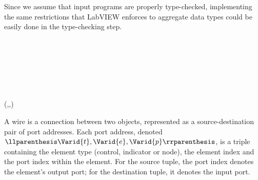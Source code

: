 Since we assume that input programs are properly type-checked, implementing
the same restrictions that LabVIEW enforces to aggregate data types could be
easily done in the type-checking step.

\begin{hscode}\SaveRestoreHook
{}%
%
%
%
%
%
\>[B]{}\;\<[15]%
\>[15]{}\mathrel{=}{}\<[15E]%
\>[18]{}\;\<[E]%
\\
\>[15]{}\mid {}\<[15E]%
\>[18]{}\;\<[E]%
\\
\>[15]{}\mid {}\<[15E]%
\>[18]{}\;\<[E]%
\\
\>[15]{}\mid {}\<[15E]%
\>[18]{}\;\<[E]%
\\
\>[15]{}\mid {}\<[15E]%
\>[18]{}\<[E]%
\\
\>[15]{}\mid {}\<[15E]%
\>[18]{}\<[E]%
\\
\>[B]{}\<[4]%
\>[4]{}\;(,,){}\<[E]%
\ColumnHook
\end{hscode}\resethooks

A wire is a connection between two objects, represented as a
source-destination pair of port addresses. Each port address, denoted
\ensuremath{\llparenthesis \Varid{t}, \Varid{e}, \Varid{p}\rrparenthesis }, is a triple containing the element type (control, indicator
or node), the element index and the port index within the element. For the
source tuple, the port index denotes the element's output port; for the
destination tuple, it denotes the input port. 

